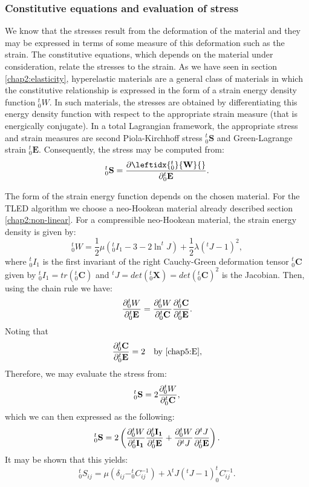 		\subsubsection*{Constitutive equations and evaluation of stress}
We know that the stresses result from the deformation of the material and they may be expressed in terms of some measure of this deformation such as the strain. The constitutive equations, which depends on the material under consideration, relate the stresses to the strain. As we have seen in section \ref{chap2:elasticity}, hyperelastic materials are a general class of materials in which the constitutive relationship is expressed in the form of a strain energy density function $ _0^t W $. In such materials, the stresses are obtained by differentiating this energy density function with respect to the appropriate strain measure (that is energically conjugate). In a total Lagrangian framework, the appropriate stress and strain measures are second Piola-Kirchhoff stress $ _0^t \mathbf{S} $ and Green-Lagrange strain $ _0^t \mathbf{E} $. Consequently, the stress may be computed from:
\begin{equation}
_0^t\mathbf{S} = \pd{ \leftidx{_0^t}{ \mathbf{W} }{} }{_0^t \mathbf{E}}.
\end{equation}

The form of the strain energy function depends on the chosen material. For the TLED algorithm we choose a neo-Hookean material already described section \ref{chap2:non-linear}. For a compressible neo-Hookean material, the strain energy density is given by:
\begin{equation}
\label{chap5:strainEnergyFunction}
_0^t W = \dfrac{1}{2} \mu (_0^t I_1 - 3 - 2 \ln ^t J) + \dfrac{1}{2} \lambda (^t J - 1)^2,
\end{equation}
where $_0^t I_1 $ is the first invariant of the right Cauchy-Green deformation tensor $ _0^t \mathbf{C} $ given by $ _0^t I_1 = tr(_0^t \mathbf{C}) $ and $ ^t J = det(_0^t \mathbf{X}) = det(_0^t \mathbf{C})^2 $ is the Jacobian.
%		
Then, using the chain rule we have:
\begin{equation}
\dfrac{\partial _0^t W}{\partial _0^t\mathbf{E}} = \dfrac{\partial _0^t W}{\partial _0^t\mathbf{C}} \dfrac{\partial _0^t\mathbf{C}}{\partial _0^t\mathbf{E}}.
\end{equation}
Noting that
\begin{equation}
\dfrac{\partial _0^t\mathbf{C}}{\partial _0^t\mathbf{E}} = 2 \quad \mbox{by \eqref{chap5:E}},
\end{equation}
Therefore, we may evaluate the stress from:
\begin{equation}
_0^t\mathbf{S}  = 2 \dfrac{\partial _0^t W}{\partial _0^t\mathbf{C}},
\end{equation}
which we can then expressed as the following:
\begin{equation}
_0^t\mathbf{S}  = 2 \left( \dfrac{\partial _0^t W}{\partial _0^t\mathbf{I_1}} \dfrac{\partial _0^t\mathbf{I_1}}{\partial _0^t\mathbf{E}} + \dfrac{\partial _0^t W}{\partial ^t J} \dfrac{\partial ^t J}{\partial _0^t\mathbf{E}} \right). 
\end{equation}
It may be shown that this yields:
\begin{equation}
_0^t S_{ij} = \mu (\delta_{ij} - _0^tC_{ij}^{-1}) + \lambda ^t J (^t J -1) _0^t C_{ij}^{-1}.
\end{equation}


